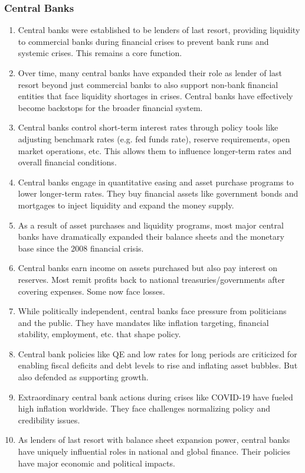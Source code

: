 \subsubsection{Central Banks}
\begin{enumerate}

\item Central banks were established to be lenders of last resort, providing liquidity to commercial banks during financial crises to prevent bank runs and systemic crises. This remains a core function.

\item Over time, many central banks have expanded their role as lender of last resort beyond just commercial banks to also support non-bank financial entities that face liquidity shortages in crises. Central banks have effectively become backstops for the broader financial system.

\item Central banks control short-term interest rates through policy tools like adjusting benchmark rates (e.g. fed funds rate), reserve requirements, open market operations, etc. This allows them to influence longer-term rates and overall financial conditions.

\item Central banks engage in quantitative easing and asset purchase programs to lower longer-term rates. They buy financial assets like government bonds and mortgages to inject liquidity and expand the money supply.

\item As a result of asset purchases and liquidity programs, most major central banks have dramatically expanded their balance sheets and the monetary base since the 2008 financial crisis.

\item Central banks earn income on assets purchased but also pay interest on reserves. Most remit profits back to national treasuries/governments after covering expenses. Some now face losses.

\item While politically independent, central banks face pressure from politicians and the public. They have mandates like inflation targeting, financial stability, employment, etc. that shape policy.

\item Central bank policies like QE and low rates for long periods are criticized for enabling fiscal deficits and debt levels to rise and inflating asset bubbles. But also defended as supporting growth.

\item Extraordinary central bank actions during crises like COVID-19 have fueled high inflation worldwide. They face challenges normalizing policy and credibility issues.

\item As lenders of last resort with balance sheet expansion power, central banks have uniquely influential roles in national and global finance. Their policies have major economic and political impacts.

\end{enumerate}

